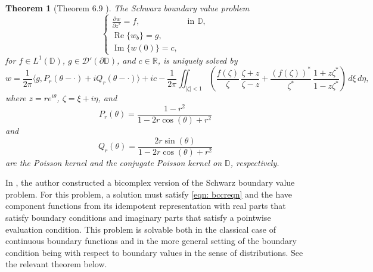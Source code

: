 \documentclass[12pt,reqno]{amsart}
\newtheorem{theorem}{Theorem}[section]
\theoremstyle{definition}
\theoremstyle{remark}
\newcommand{\p}{\partial}
\DeclareMathOperator{\im}{Im}
\DeclareMathOperator{\re}{Re}
\newcommand{\disk}{\mathbb{D}}
\begin{document}
    \begin{theorem}[Theorem 6.9 \cite{WBD}]\label{nonhomogsbvp}
        The Schwarz boundary value problem
        \[\begin{cases}
            \frac{\p w}{\p z^*} = f, &\text{ in } \disk,\\
            \re\{w_b\} = g,\\
            \im\{w(0)\} = c,
        \end{cases}\]
        for $f \in L^1(\disk)$, $g\in \mathcal{D}'(\p \disk)$, and $c\in \mathbb{R}$, is uniquely solved by 
        \[
            w = \frac{1}{2\pi}\langle g, P_r(\theta - \cdot) + iQ_r(\theta - \cdot)\rangle + ic  - \frac{1}{2\pi}\iint_{|\zeta|<1} \left( \frac{f(\zeta)}{\zeta}\,\frac{\zeta + z}{\zeta - z} + \frac{(f(\zeta))^*}{\zeta^*}\,\frac{1+z\zeta^*}{1-z\zeta^*}\right)\,d\xi\,d\eta,
        \]
        where $z = re^{i\theta}$, $\zeta = \xi + i \eta$, and
        \[
            P_r(\theta) = \frac{1-r^2}{1-2r\cos(\theta) + r^2}
        \]
        and 
        \[
            Q_r(\theta) =  \frac{2r\sin(\theta)}{1-2r\cos(\theta) + r^2}
        \]
        are the Poisson kernel and the conjugate Poisson kernel on $\disk$, respectively. 
        \end{theorem}

  

    In \cite{BCSchwarz}, the author constructed a bicomplex version of the Schwarz boundary value problem. For this problem, a solution must satisfy \eqref{eqn: bccreqn} and the have component functions from its idempotent representation with real parts that satisfy boundary conditions and imaginary parts that satisfy a pointwise evaluation condition. This problem is solvable both in the classical case of continuous boundary functions and in the more general setting of the boundary condition being with respect to boundary values in the sense of distributions.  See the relevant theorem below. 
\end{document}

